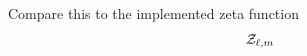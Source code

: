 \documentclass[a4paper]{article}
\begin{document}
Compare this to the implemented zeta function
\begin{align}
 {\cal Z}_{\ell,m}

\end{align}
\end{document}
